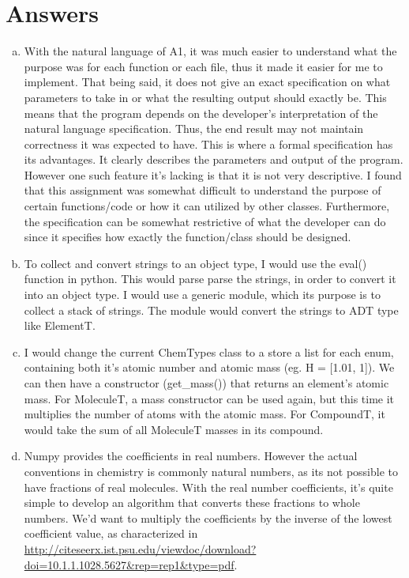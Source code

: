 \documentclass[12pt]{article}
\begin{document}
\section{Answers}

\begin{enumerate}[a)]

\item
With the natural language of A1, it was much easier to understand what the purpose was for each function or each file, thus it made it easier for me to implement. That being said, it does not give an exact specification on what parameters to take in or what the resulting output should exactly be. This means that the program depends on the developer's interpretation of the natural language specification. Thus, the end result may not maintain correctness it was expected to have. 
\newline
This is where a formal specification has its advantages. It clearly describes the parameters and output of the program. However one such feature it's lacking is that it is not very descriptive. I found that this assignment was somewhat difficult to understand the purpose of certain functions/code or how it can utilized by other classes. Furthermore, the specification can be somewhat restrictive of what the developer can do since it specifies how exactly the function/class should be designed.   

\item
To collect and convert strings to an object type, I would use the eval() function in python. This would parse parse the strings, in order to convert it into an object type. I would use a generic module, which its purpose is to collect a stack of strings. The module would convert the strings to ADT type like ElementT. 

\item
I would change the current ChemTypes class to a store a list for each enum, containing both it's atomic number and atomic mass (eg. H = [1.01, 1]). We can then have a constructor (get\_mass()) that returns an element's atomic mass. For MoleculeT, a mass constructor can be used again, but this time it multiplies the number of atoms with the atomic mass. For CompoundT, it would take the sum of all MoleculeT masses in its compound.

\item
Numpy provides the coefficients in real numbers. However the actual conventions in chemistry is commonly natural numbers, as its not possible to have fractions of real molecules. With the real number coefficients, it's quite simple to develop an algorithm that converts these fractions to whole numbers. We'd want to multiply the coefficients by the inverse of the lowest coefficient value, as characterized in \url{http://citeseerx.ist.psu.edu/viewdoc/download?doi=10.1.1.1028.5627&rep=rep1&type=pdf}. 


\end{enumerate}
\end{document}
